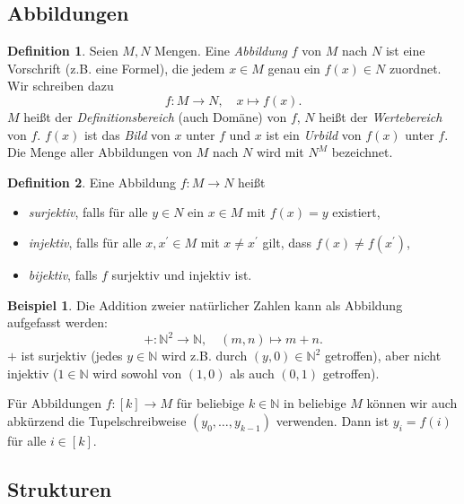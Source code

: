 \documentclass[11pt, a4paper]{article}
\theoremstyle{definition}
\newtheorem{definition}{Definition}[section]
\newtheorem*{example*}{Beispiel}
\theoremstyle{plain}
\numberwithin{equation}{section}
\begin{document}
\subsection{Abbildungen}\label{sec:pre_mappings}
\begin{definition}
	Seien \( M, N \) Mengen. Eine \textit{Abbildung} \( f \) von \( M \) nach \( N \) ist eine Vorschrift (z.B. eine Formel), die jedem \( x \in M \) genau ein \( f(x) \in N \) zuordnet. Wir schreiben dazu
	\[
		f: M \to N, \quad x \mapsto f(x).
	\]
	\( M \) heißt der \textit{Definitionsbereich} (auch Domäne) von \( f \), \( N \) heißt der \textit{Wertebereich} von \( f \). \( f(x) \) ist das \textit{Bild} von \( x \) unter \( f \) und \( x \) ist ein \textit{Urbild} von \( f(x) \) unter \( f \). Die Menge aller Abbildungen von \( M \) nach \( N \) wird mit \( N^M \) bezeichnet. 
\end{definition}

\begin{definition}
	Eine Abbildung \( f: M \to N \) heißt
	\begin{itemize}
		\item \textit{surjektiv}, falls für alle \( y \in N \) ein \( x \in M \) mit \( f(x) = y \) existiert,
		\item \textit{injektiv}, falls für alle \( x, x^\prime \in M \) mit \( x \neq x^\prime \) gilt, dass \( f(x) \neq f(x^\prime) \),
		\item \textit{bijektiv}, falls \( f \) surjektiv und injektiv ist.
	\end{itemize}
\end{definition}
\begin{example*}
	Die Addition zweier natürlicher Zahlen kann als Abbildung aufgefasst werden:
	\[
		+: \mathbb{N}^2 \to \mathbb{N}, \quad (m, n) \mapsto m+n.
	\]
	\( + \) ist surjektiv (jedes \( y \in \mathbb{N} \) wird z.B. durch \( (y, 0) \in \mathbb{N}^2 \) getroffen), aber nicht injektiv (\( 1 \in \mathbb{N} \) wird sowohl von \( (1, 0) \) als auch \( (0, 1) \) getroffen).
\end{example*}
Für Abbildungen \( f: [k] \to M \) für beliebige \( k \in \mathbb{N} \) in beliebige \( M \) können wir auch abkürzend die Tupelschreibweise \( (y_0, \ldots, y_{k-1}) \) verwenden. Dann ist \( y_i = f(i) \) für alle \( i \in [k] \).


\subsection{Strukturen}\label{sec:pre_structures}
\end{document}
